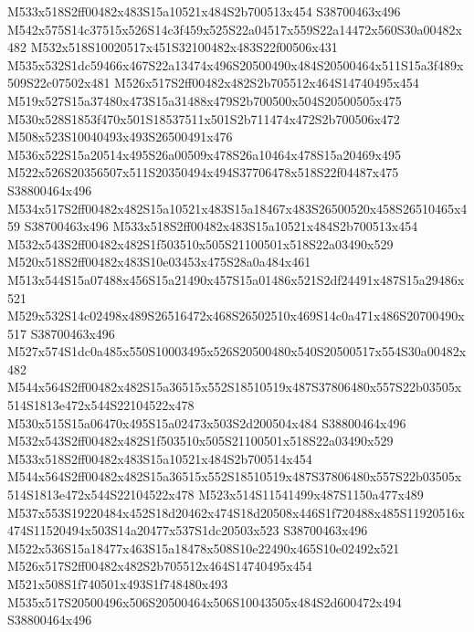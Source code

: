 \documentclass{article}
\begin{document}
\begin{multicols}{2}


M533x518S2ff00482x483S15a10521x484S2b700513x454 S38700463x496 M542x575S14c37515x526S14c3f459x525S22a04517x559S22a14472x560S30a00482x482 M532x518S10020517x451S32100482x483S22f00506x431 M535x532S1dc59466x467S22a13474x496S20500490x484S20500464x511S15a3f489x509S22c07502x481 M526x517S2ff00482x482S2b705512x464S14740495x454 M519x527S15a37480x473S15a31488x479S2b700500x504S20500505x475 M530x528S1853f470x501S18537511x501S2b711474x472S2b700506x472 M508x523S10040493x493S26500491x476 M536x522S15a20514x495S26a00509x478S26a10464x478S15a20469x495 M522x526S20356507x511S20350494x494S37706478x518S22f04487x475 S38800464x496 M534x517S2ff00482x482S15a10521x483S15a18467x483S26500520x458S26510465x459 S38700463x496 M533x518S2ff00482x483S15a10521x484S2b700513x454 M532x543S2ff00482x482S1f503510x505S21100501x518S22a03490x529 M520x518S2ff00482x483S10e03453x475S28a0a484x461 M513x544S15a07488x456S15a21490x457S15a01486x521S2df24491x487S15a29486x521 M529x532S14c02498x489S26516472x468S26502510x469S14c0a471x486S20700490x517 S38700463x496 M527x574S1dc0a485x550S10003495x526S20500480x540S20500517x554S30a00482x482 M544x564S2ff00482x482S15a36515x552S18510519x487S37806480x557S22b03505x514S1813e472x544S22104522x478 M530x515S15a06470x495S15a02473x503S2d200504x484 S38800464x496 M532x543S2ff00482x482S1f503510x505S21100501x518S22a03490x529 M533x518S2ff00482x483S15a10521x484S2b700514x454 M544x564S2ff00482x482S15a36515x552S18510519x487S37806480x557S22b03505x514S1813e472x544S22104522x478 M523x514S11541499x487S1150a477x489 M537x553S19220484x452S18d20462x474S18d20508x446S1f720488x485S11920516x474S11520494x503S14a20477x537S1dc20503x523 S38700463x496 M522x536S15a18477x463S15a18478x508S10e22490x465S10e02492x521 M526x517S2ff00482x482S2b705512x464S14740495x454 M521x508S1f740501x493S1f748480x493 M535x517S20500496x506S20500464x506S10043505x484S2d600472x494 S38800464x496




\end{multicols}
\end{document}
